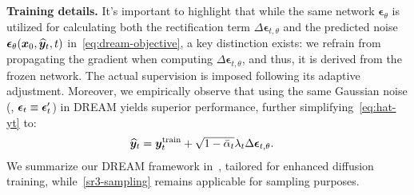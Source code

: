 \textbf{Training details.}  It's important to highlight that while the same network $\bm\epsilon_\theta$ is utilized for calculating both the rectification term $\Delta\bm\epsilon_{t,\theta}$ and the predicted noise $\bm{{\mathbf{\epsilon}}}_{\mathbf{\theta}}({\bm{x}}_0,\widehat{{\bm{y}}}_t, t)$ in~\cref{eq:dream-objective}, a key distinction exists:  we refrain from propagating the gradient when computing $\Delta\bm\epsilon_{t,\theta}$, and thus, it is derived from the frozen network. The actual supervision is imposed following its adaptive adjustment. Moreover, we empirically observe that using the same Gaussian noise (\ie, $\bm{{\mathbf{\epsilon}}}_t\equiv\bm{{\mathbf{\epsilon}}}'_t$) in DREAM yields superior performance, further simplifying~\cref{eq:hat-yt} to:
\begin{align}
    \widehat{{\bm{y}}}_t & = {\bm{y}}_t^{\text{train}}+ \sqrt{1-\bar{\alpha}_t}\lambda_t\Delta\bm{{\mathbf{\epsilon}}}_{t,\theta}.
\end{align}
We summarize our DREAM framework in~, tailored for enhanced diffusion training, while~\cref{sr3-sampling} remains applicable for sampling purposes.






